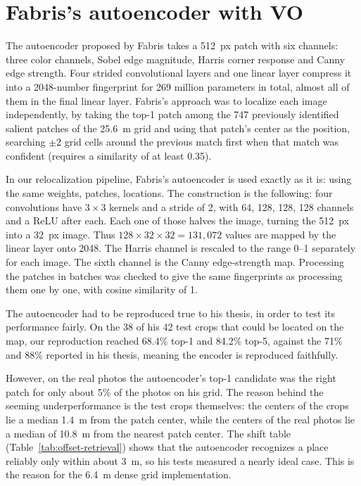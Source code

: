 \documentclass[english, Lau, oneside]{sapthesis}%
\begin{document}
\section{Fabris's autoencoder with VO}
\label{sec:reloc-ae}
The autoencoder proposed by Fabris takes a 512~px patch with six channels: three color channels, Sobel edge magnitude, Harris corner response and Canny edge strength. Four strided convolutional layers and one linear layer compress it into a 2048-number fingerprint for 269 million parameters in total, almost all of them in the final linear layer. Fabris's approach was to localize each image independently, by taking the top-1 patch among the 747 previously identified salient patches of the 25.6~m grid and using that patch's center as the position, searching $\pm 2$ grid cells around the previous match first when that match was confident (requires a similarity of at least 0.35).

In our relocalization pipeline, Fabris's autoencoder is used exactly as it is: using the same weights, patches, locations. The construction is the following: four convolutions have $3 \times 3$ kernels and a stride of 2, with 64, 128, 128, 128 channels and a ReLU after each. Each one of those halves the image, turning the 512~px into a 32~px image. Thus $128 \times 32 \times 32 = 131{,}072$ values are mapped by the linear layer onto 2048. The Harris channel is rescaled to the range 0--1 separately for each image. The sixth channel is the Canny edge-strength map. Processing the patches in batches was checked to give the same fingerprints as processing them one by one, with cosine similarity of 1.

The autoencoder had to be reproduced true to his thesis, in order to test its performance fairly. On the 38 of his 42 test crops that could be located on the map, our reproduction reached 68.4\% top-1 and 84.2\% top-5, against the 71\% and 88\% reported in his thesis, meaning the encoder is reproduced faithfully.

However, on the real photos the autoencoder's top-1 candidate was the right patch for only about 5\% of the photos on his grid. The reason behind the seeming underperformance is the test crops themselves: the centers of the crops lie a median 1.4~m from the patch center, while the centers of the real photos lie a median of 10.8~m from the nearest patch center. The shift table (Table~\ref{tab:offset-retrieval}) shows that the autoencoder recognizes a place reliably only within about 3~m, so his tests measured a nearly ideal case. This is the reason for the 6.4~m dense grid implementation.
\end{document}
